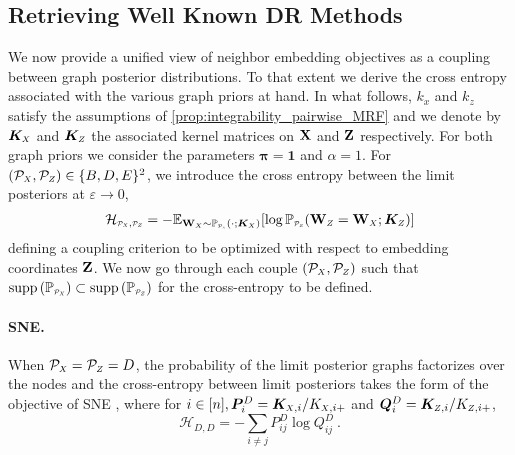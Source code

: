 \subsection{Retrieving Well Known DR Methods}\label{sec:retrieving_DR_methods}

We now provide a unified view of neighbor embedding objectives as a coupling between graph posterior distributions. To that extent we derive the cross entropy associated with the various graph priors at hand. In what follows, $k_x$ and $k_z$ satisfy the assumptions of \cref{prop:integrability_pairwise_MRF} and we denote by $\bm{K}_{\scaleto{X}{4pt}}$ and $\bm{K}_{\scaleto{Z}{4pt}}$ the associated kernel matrices on  $\mathbf{X}$ and $\mathbf{Z}$ respectively. For both graph priors we consider the parameters $\bm{\pi}=\bm{1}$ and $\alpha=1$. For $(\mathcal{P}_{\scaleto{X}{4pt}}, \mathcal{P}_{\scaleto{Z}{4pt}}) \in \{B,D,E\}^2$, we introduce the 
cross entropy between the limit posteriors at $\varepsilon \to 0$,
\begin{align*}
    \mathcal{H}_{\scaleto{\mathcal{P}_X}{4pt}, \scaleto{\mathcal{P}_Z}{4pt}} = - \mathbb{E}_{\W_{\scaleto{X}{3pt}} \sim \mathbb{P}_{\scaleto{\mathcal{P}_{\scaleto{X}{2pt}}}{3pt}}(\cdot;\bm{K}_{\scaleto{X}{3pt}})}[\log \mathbb{P}_{\scaleto{\mathcal{P}_{\scaleto{Z}{3pt}}}{4pt}}(\W_{\scaleto{Z}{4pt}} = \W_{\scaleto{X}{4pt}}; \bm{K}_{\scaleto{Z}{4pt}})]
\end{align*}
defining a coupling criterion to be optimized with respect to embedding coordinates $\mathbf{Z}$. We now go through each couple $(\mathcal{P}_{\scaleto{X}{4pt}}, \mathcal{P}_{\scaleto{Z}{4pt}})$ such that $\operatorname{supp}\left(\mathbb{P}_{\scaleto{\mathcal{P}_X}{4pt}}\right) \subset \operatorname{supp}\left(\mathbb{P}_{\scaleto{\mathcal{P}_Z}{4pt}}\right)$ for the cross-entropy to be defined.

\paragraph{SNE.}
When $\mathcal{P}_{\scaleto{X}{4pt}} = \mathcal{P}_{\scaleto{Z}{4pt}} = D$, the probability of the limit posterior graphs factorizes over the nodes and the cross-entropy between limit posteriors takes the form of the objective of SNE \cite{hinton2002stochastic}, where for $i \in [n], \bm{P}^{D}_{i} = \bm{K}_{\scaleto{X}{4pt},i} / K_{\scaleto{X}{4pt},i+}$ and $\bm{Q}^{D}_{i} = \bm{K}_{\scaleto{Z}{4pt},i} / K_{\scaleto{Z}{4pt},i+}$,
$$\mathcal{H}_{D,D}= - \sum_{i \neq j} P^{D}_{ij} \log Q^{D}_{ij} \:.$$

